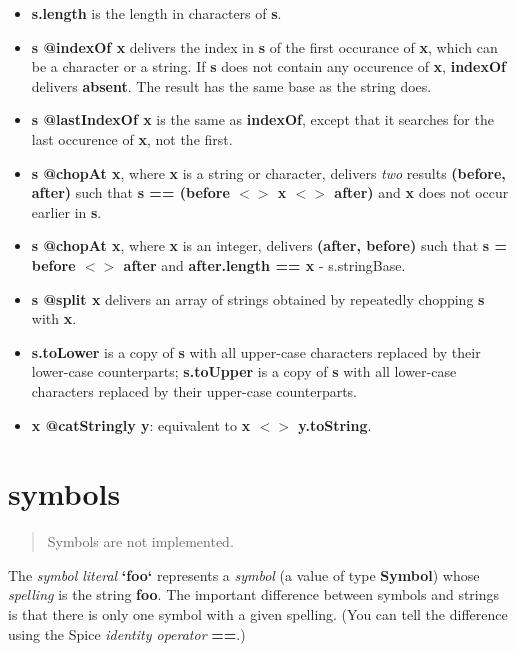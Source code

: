 \documentclass{report}
\begin{document}
\begin{itemize}\item {\bf s.length} is the length in characters of {\bf s}.

\item {\bf s @indexOf x} delivers the index in {\bf s} of the first occurance of
{\bf x}, which can be a character or a string. If {\bf s} does not contain any
occurence of {\bf x}, {\bf indexOf} delivers {\bf absent}. The result has the same
base as the string does.

\item {\bf s @lastIndexOf x} is the same as {\bf indexOf}, except that it searches
for the last occurence of {\bf x}, not the first.

\item {\bf s @chopAt x}, where {\bf x} is a string or character, delivers {\em two}
results {\bf (before, after)} such that {\bf s == (before $<$$>$ x $<$$>$ after)} and
{\bf x} does not occur earlier in {\bf s}.

\item {\bf s @chopAt x}, where {\bf x} is an integer, delivers {\bf (after, before)}
such that {\bf s = before $<$$>$ after} and {\bf after.length == x} -
s.stringBase.

\item {\bf s @split x} delivers an array of strings obtained by repeatedly
chopping {\bf s} with {\bf x}.

\item {\bf s.toLower} is a copy of {\bf s} with all upper-case characters replaced
by their lower-case counterparts; {\bf s.toUpper} is a copy of {\bf s} with
all lower-case characters replaced by their upper-case counterparts.

\item {\bf x @catStringly y}: equivalent to {\bf x $<$$>$ y.toString}.

\end{itemize}\section{symbols}


\begin{quote}Symbols are not implemented.\end{quote}The {\em symbol literal} {\bf `foo`} represents a {\em symbol} (a value
of type {\bf Symbol}) whose {\em spelling} is the string {\bf foo}. The important
difference between symbols and strings is that there is only one
symbol with a given spelling. (You can tell the difference using the
Spice {\em identity operator} {\bf ==}.)
\end{document}
